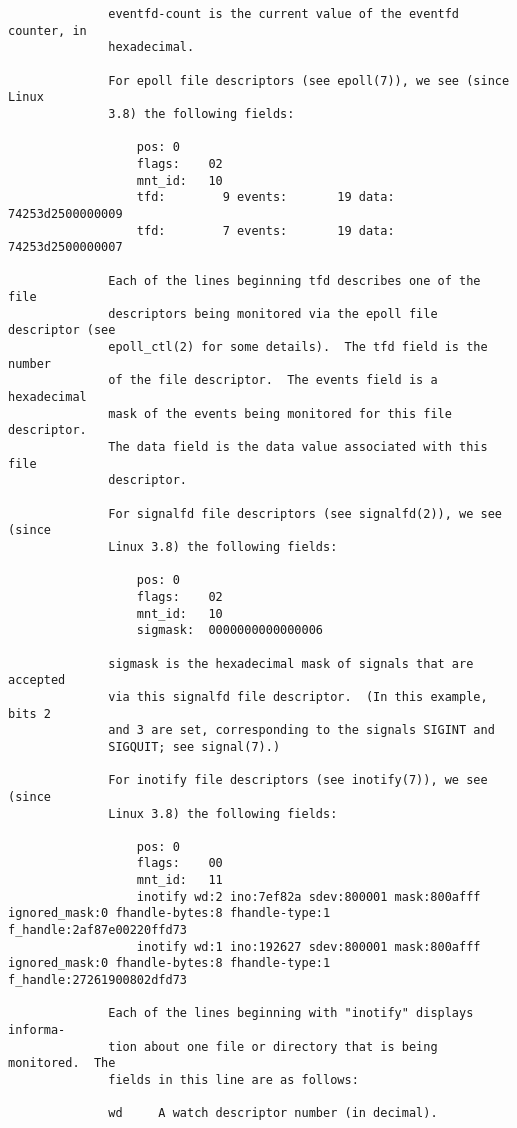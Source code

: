 \documentclass[]{article}
\begin{document}
\begin{verbatim}
              eventfd-count is the current value of the eventfd counter, in
              hexadecimal.

              For epoll file descriptors (see epoll(7)), we see (since Linux
              3.8) the following fields:

                  pos: 0
                  flags:    02
                  mnt_id:   10
                  tfd:        9 events:       19 data: 74253d2500000009
                  tfd:        7 events:       19 data: 74253d2500000007

              Each of the lines beginning tfd describes one of the file
              descriptors being monitored via the epoll file descriptor (see
              epoll_ctl(2) for some details).  The tfd field is the number
              of the file descriptor.  The events field is a hexadecimal
              mask of the events being monitored for this file descriptor.
              The data field is the data value associated with this file
              descriptor.

              For signalfd file descriptors (see signalfd(2)), we see (since
              Linux 3.8) the following fields:

                  pos: 0
                  flags:    02
                  mnt_id:   10
                  sigmask:  0000000000000006

              sigmask is the hexadecimal mask of signals that are accepted
              via this signalfd file descriptor.  (In this example, bits 2
              and 3 are set, corresponding to the signals SIGINT and
              SIGQUIT; see signal(7).)

              For inotify file descriptors (see inotify(7)), we see (since
              Linux 3.8) the following fields:

                  pos: 0
                  flags:    00
                  mnt_id:   11
                  inotify wd:2 ino:7ef82a sdev:800001 mask:800afff ignored_mask:0 fhandle-bytes:8 fhandle-type:1 f_handle:2af87e00220ffd73
                  inotify wd:1 ino:192627 sdev:800001 mask:800afff ignored_mask:0 fhandle-bytes:8 fhandle-type:1 f_handle:27261900802dfd73

              Each of the lines beginning with "inotify" displays informa‐
              tion about one file or directory that is being monitored.  The
              fields in this line are as follows:

              wd     A watch descriptor number (in decimal).


\end{verbatim}
\end{document}
